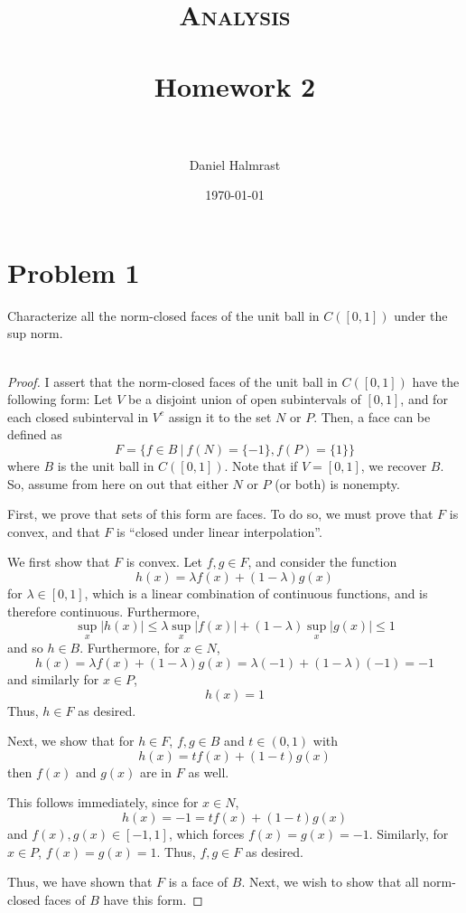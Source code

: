 \documentclass[fontsize=11pt]{scrartcl} %
\title{	
\normalfont \normalsize 
\textsc{Analysis} \\ [25pt] %
\horrule{0.5pt} \\[0.4cm] %
\huge Homework 2 \\ %
\horrule{2pt} \\[0.5cm] %
}
\author{Daniel Halmrast} %
\date{\normalsize\today} %
\numberwithin{equation}{section} %
\numberwithin{figure}{section} %
\numberwithin{table}{section} %
\begin{document}
\maketitle %

\section*{Problem 1}
Characterize all the norm-closed faces of the unit ball in $C([0,1])$ under the
sup norm.
\\
\\
\begin{proof}
    I assert that the norm-closed faces of the unit ball in $C([0,1])$ have the
    following form: Let $V$ be a disjoint union of open subintervals of $[0,1]$,
    and for each closed subinterval in $V^c$ assign it to the set $N$ or $P$.
    Then, a face can be defined as
    \[
        F = \{f\in B\ |\ f(N) = \{-1\}, f(P)=\{1\}\}
    \]
    where $B$ is the unit ball in $C([0,1])$. Note that if $V=[0,1]$, we recover
    $B$. So, assume from here on out that either $N$ or $P$ (or both) is
    nonempty.

    First, we prove that sets of this form are faces. To do so, we must prove
    that $F$ is convex, and that $F$ is ``closed under linear interpolation''.

    We first show that $F$ is convex. Let $f,g\in F$, and consider the function
    \[
        h(x) = \lambda f(x) + (1-\lambda)g(x)
    \]
    for $\lambda\in[0,1]$,
    which is a linear combination of continuous functions, and is therefore
    continuous. Furthermore,
    \[
        \sup_x |h(x)|\leq \lambda \sup_x|f(x)| + (1-\lambda)\sup_x|g(x)|
        \leq 1
    \]
    and so $h\in B$. Furthermore, for $x\in N$,
    \[
        h(x) = \lambda f(x) + (1-\lambda)g(x) = \lambda(-1) + (1-\lambda)(-1)=-1
    \]
    and similarly for $x\in P$,
    \[
        h(x) = 1
    \]
    Thus, $h\in F$ as desired.

    Next, we show that for $h\in F$, $f,g\in B$ and $t\in (0,1)$ with
    \[
        h(x) = tf(x) + (1-t)g(x)
    \]
    then $f(x)$ and $g(x)$ are in $F$ as well.

    This follows immediately, since for $x\in N$,
    \[
        h(x) = -1 = tf(x) + (1-t)g(x)
    \]
    and $f(x),g(x)\in [-1,1]$, which forces $f(x) = g(x) = -1$. Similarly, for
    $x\in P$, $f(x)=g(x)=1$. Thus, $f,g\in F$ as desired.

    Thus, we have shown that $F$ is a face of $B$. Next, we wish to show that
    all norm-closed faces of $B$ have this form.



\end{proof}
\end{document}
